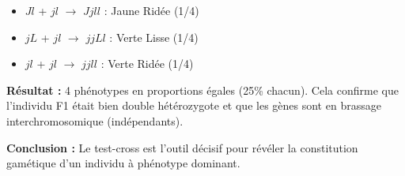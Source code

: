 \documentclass[11pt]{article}
\begin{document}
\begin{exoresolu}
\begin{enumerate}
\begin{itemize}
            \item $Jl$ + $jl$ $\to$ $Jj ll$ : Jaune Ridée (1/4)
            \item $jL$ + $jl$ $\to$ $jj Ll$ : Verte Lisse (1/4)
            \item $jl$ + $jl$ $\to$ $jj ll$ : Verte Ridée (1/4)
        \end{itemize}
        \textbf{Résultat :} 4 phénotypes en proportions égales (25\% chacun). Cela confirme que l'individu F1 était bien double hétérozygote et que les gènes sont en brassage interchromosomique (indépendants).
    \end{enumerate}
    \textbf{Conclusion :} Le test-cross est l'outil décisif pour révéler la constitution gamétique d'un individu à phénotype dominant.
\end{exoresolu}
\end{document}
